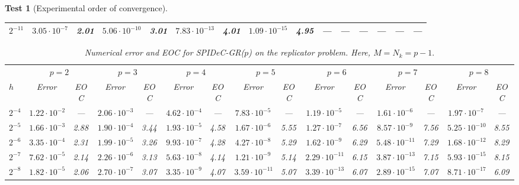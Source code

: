 \documentclass[a4paper,num-refs]{oup-contemporary-spidec}
\newtheorem{testcase}{Test} %
\begin{document}
\begin{testcase}[Experimental order of convergence]
\begin{table}[htb]
\begin{tabular}{l |cc |cc |cc |cc |cc |cc |cc|}
    $2^{-11}$ & $3.05 \cdot 10^{-7}$ & 2.01 & $5.06 \cdot 10^{-10}$ & 3.01 & $7.83 \cdot 10^{-13}$ & 4.01 & $1.09 \cdot 10^{-15}$ & 4.95 & --- & --- & --- & --- & --- & --- \\
    \bottomrule
    \end{tabular}
\end{table}
\begin{table}[htb]
    \centering
    \caption{Numerical error and EOC for SPIDeC-GR($p$) on the replicator problem. Here, $M=N_k=p-1.$}\label{tab:GR_full}
    \scriptsize
    \setlength{\tabcolsep}{3pt}
    \begin{tabular}{l |cc |cc |cc |cc |cc |cc |cc|}
    \toprule
    \multicolumn{1}{c}{} & \multicolumn{2}{c}{$p=2$} & \multicolumn{2}{c}{$p=3$} & \multicolumn{2}{c}{$p=4$} & \multicolumn{2}{c}{$p=5$} & \multicolumn{2}{c}{$p=6$} & \multicolumn{2}{c}{$p=7$} & \multicolumn{2}{c}{$p=8$} \\
    \cmidrule(lr){2-3} \cmidrule(lr){4-5} \cmidrule(lr){6-7} \cmidrule(lr){8-9} \cmidrule(lr){10-11} \cmidrule(lr){12-13} \cmidrule(lr){14-15}
    $h$ & Error & EOC & Error & EOC & Error & EOC & Error & EOC & Error & EOC & Error & EOC & Error & EOC \\
    \midrule
    $2^{-4}$ & $1.22 \cdot 10^{-2}$ & ---  & $2.06 \cdot 10^{-3}$ & ---  & $4.62 \cdot 10^{-4}$ & ---  & $7.83 \cdot 10^{-5}$ & ---  & $1.19 \cdot 10^{-5}$ & ---  & $1.61 \cdot 10^{-6}$ & ---  & $1.97 \cdot 10^{-7}$ & ---  \\
    $2^{-5}$ & $1.66 \cdot 10^{-3}$ & 2.88 & $1.90 \cdot 10^{-4}$ & 3.44 & $1.93 \cdot 10^{-5}$ & 4.58 & $1.67 \cdot 10^{-6}$ & 5.55 & $1.27 \cdot 10^{-7}$ & 6.56 & $8.57 \cdot 10^{-9}$ & 7.56 & $5.25 \cdot 10^{-10}$ & 8.55 \\
    $2^{-6}$ & $3.35 \cdot 10^{-4}$ & 2.31 & $1.99 \cdot 10^{-5}$ & 3.26 & $9.93 \cdot 10^{-7}$ & 4.28 & $4.27 \cdot 10^{-8}$ & 5.29 & $1.62 \cdot 10^{-9}$ & 6.29 & $5.48 \cdot 10^{-11}$ & 7.29 & $1.68 \cdot 10^{-12}$ & 8.29 \\
    $2^{-7}$ & $7.62 \cdot 10^{-5}$ & 2.14 & $2.26 \cdot 10^{-6}$ & 3.13 & $5.63 \cdot 10^{-8}$ & 4.14 & $1.21 \cdot 10^{-9}$ & 5.14 & $2.29 \cdot 10^{-11}$ & 6.15 & $3.87 \cdot 10^{-13}$ & 7.15 & $5.93 \cdot 10^{-15}$ & 8.15 \\
    $2^{-8}$ & $1.82 \cdot 10^{-5}$ & 2.06 & $2.70 \cdot 10^{-7}$ & 3.07 & $3.35 \cdot 10^{-9}$ & 4.07 & $3.59 \cdot 10^{-11}$ & 5.07 & $3.39 \cdot 10^{-13}$ & 6.07 & $2.89 \cdot 10^{-15}$ & 7.07 & $8.71 \cdot 10^{-17}$ & 6.09 \\

\end{tabular}
\end{table}
\end{testcase}
\end{document}

